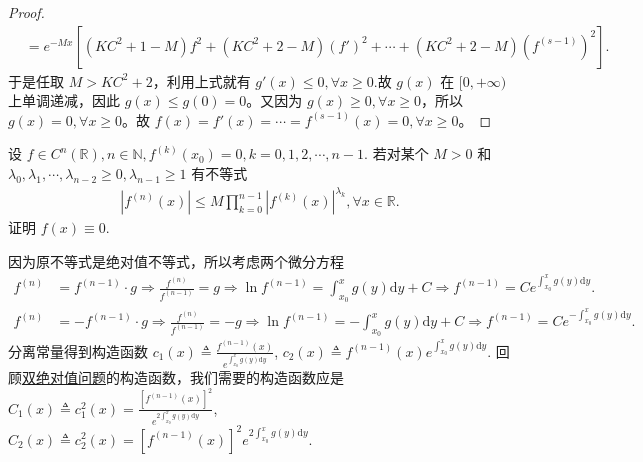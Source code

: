 \documentclass[../../main.tex]{subfiles}
\begin{document}
\begin{proof}
\begin{align*}
&=e^{-Mx}\left[ \left( KC^2+1-M \right) f^2+\left( KC^2+2-M \right) \left( f' \right) ^2+\cdots +\left( KC^2+2-M \right) \left( f^{\left( s-1 \right)} \right) ^2 \right] .
\end{align*}
于是任取 $M>KC^2+2$，利用上式就有 $g'\left( x \right) \leqslant 0,\forall x\geqslant  0$.故 $g\left( x \right)$ 在 $[0,+\infty )$ 上单调递减，因此 $g\left( x \right) \leqslant g\left( 0 \right) =0$。又因为 $g\left( x \right) \geqslant 0,\forall x\geqslant 0$，所以 $g\left( x \right) =0,\forall x\geqslant 0$。故
$f\left( x \right) =f'\left( x \right) =\cdots =f^{\left( s-1 \right)}\left( x \right) =0,\forall x\geqslant 0$。

\end{proof}

\begin{example}
设 $f \in C^n(\mathbb{R}), n \in \mathbb{N}, f^{(k)}(x_0) = 0, k = 0, 1, 2, \cdots, n - 1$. 若对某个 $M > 0$ 和 $\lambda_0, \lambda_1, \cdots, \lambda_{n - 2} \geqslant  0, \lambda_{n - 1} \geqslant  1$ 有不等式
\begin{align*}
|f^{(n)}(x)| \leqslant  M \prod_{k = 0}^{n - 1} |f^{(k)}(x)|^{\lambda_k}, \forall x \in \mathbb{R}.
\end{align*}
证明 $f(x) \equiv 0$.
\end{example}
\begin{note}
因为原不等式是绝对值不等式，所以考虑两个微分方程
\begin{align*}
f^{(n)} &= f^{(n-1)} \cdot g \Rightarrow \frac{f^{(n)}}{f^{(n-1)}} = g \Rightarrow \ln f^{(n-1)} = \int_{x_0}^x g(y) \mathrm{d}y + C \Rightarrow f^{(n-1)} = C e^{\int_{x_0}^x g(y) \mathrm{d}y}.
\end{align*}
\begin{align*}
f^{(n)} &= -f^{(n-1)} \cdot g \Rightarrow \frac{f^{(n)}}{f^{(n-1)}} = -g \Rightarrow \ln f^{(n-1)} = -\int_{x_0}^x g(y) \mathrm{d}y + C \Rightarrow f^{(n-1)} = C e^{-\int_{x_0}^x g(y) \mathrm{d}y}.
\end{align*}
分离常量得到构造函数 $c_1(x) \triangleq \frac{f^{(n-1)}(x)}{e^{\int_{x_0}^x g(y) \mathrm{d}y}}$, $c_2(x) \triangleq f^{(n-1)}(x) e^{\int_{x_0}^x g(y) \mathrm{d}y}$.
回顾\hyperref[subsection:双绝对值问题]{双绝对值问题}的构造函数，我们需要的构造函数应是 $C_1(x) \triangleq c_1^2(x) = \frac{[f^{(n-1)}(x)]^2}{e^{2\int_{x_0}^x g(y) \mathrm{d}y}}$, $C_2(x) \triangleq c_2^2(x) = [f^{(n-1)}(x)]^2 e^{2\int_{x_0}^x g(y) \mathrm{d}y}$.
\end{note}
\end{document}
